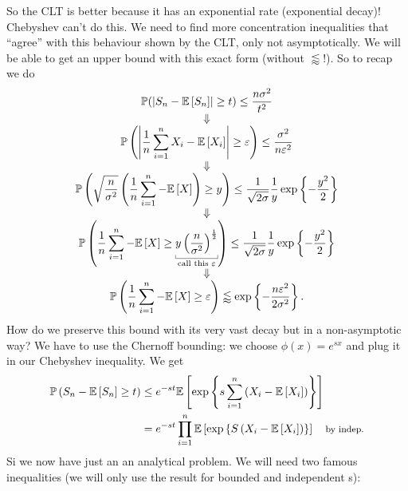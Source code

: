 \documentclass[12pt]{report}
\begin{document}
So the CLT is better because it has an exponential rate (exponential decay)! Chebyshev can't do this. We need to find more concentration inequalities that ``agree'' with this behaviour shown by the CLT, only not asymptotically. We will be able to get an upper bound with this exact form (without $\lessapprox$!). So to recap we do
\begin{equation*}
	\begin{array}{>{\displaystyle}c}
		\pr(\left|S_{n}-\ev{S_{n}}\right|\geq t)\leq\frac{n\sigma^{2}}{t^{2}}\\
		\Downarrow\\
		\pr\left(\left|\frac{1}{n}\sum_{i=1}^{n}X_{i}-\ev{X_{i}}\right|\geq \varepsilon\right)\leq\frac{\sigma^{2}}{n\varepsilon^{2}}\\
		\Downarrow\\
		\pr\left(\sqrt{\frac{n}{\sigma^{2}}}\left(\frac{1}{n}\sum_{i=1}^{n}-\ev{X}\right)\geq y\right)\leq\frac{1}{\sqrt{2\sigma}}\frac{1}{y}\expg{-\frac{y^{2}}{2}}\\
		\Downarrow\\
			\pr\left(\frac{1}{n}\sum_{i=1}^{n}-\ev{X}\geq\ubracketthin{ y\left(\frac{n}{\sigma^{2}}\right)^{\frac{1}{2}}}_{\text{call this }\varepsilon}\right)\leq\frac{1}{\sqrt{2\sigma}}\frac{1}{y}\expg{-\frac{y^{2}}{2}}\\
		\Downarrow\\
			\pr\left(\frac{1}{n}\sum_{i=1}^{n}-\ev{X}\geq\varepsilon\right)\lessapprox\expg{-\frac{n\varepsilon^{2}}{2\sigma^{2}}}.
	\end{array}
\end{equation*}
How do we preserve this bound with its very vast decay but in a non-asymptotic way? We have to use the Chernoff bounding: we choose $\phi(x)=e^{sx}$ and plug it in our Chebyshev inequality. We get
\begin{align*}
	\mathbb{P}\left(S_{n}-\mathbb{E}\left[S_{n}\right]\geq t\right)&\leq e^{-st}\mathbb{E}\left[\exp\left\{s\sum_{i=1}^{n}\left(X_{i}-\mathbb{E}\left[X_{i}\right]\right)\right\}\right]\\
	&=e^{-st}\prod_{i=1}^{n}\mathbb{E}\left[\exp\left\{S\left(X_{i}-\mathbb{E}\left[X_{i}\right]\right)\right\}\right]\quad\text{\footnotesize by indep.}
\end{align*}
Si we now have just an an analytical problem. We will need two famous inequalities (we will only use the result for bounded and independent \rv s):
\end{document}
